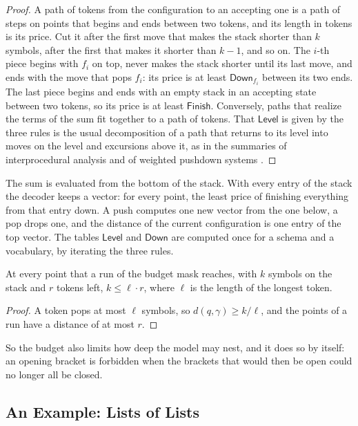 \documentclass[acmsmall,nonacm,screen]{acmart}
\newcommand{\kw}[1]{\mathsf{#1}}
\newcommand{\far}{d}
\newcommand{\Down}{\kw{Down}}
\newcommand{\Level}{\kw{Level}}
\newcommand{\Finish}{\kw{Finish}}
\begin{document}
\begin{proof}
A path of tokens from the configuration to an accepting one is a path of steps on points
that begins and ends between two tokens, and its length in tokens is its price. Cut it after
the first move that makes the stack shorter than $k$ symbols, after the first that makes it
shorter than $k - 1$, and so on. The $i$-th piece begins with $f_i$ on top, never makes the
stack shorter until its last move, and ends with the move that pops $f_i$: its price is at
least $\Down_{f_i}$ between its two ends. The last piece begins and ends with an empty stack
in an accepting state between two tokens, so its price is at least $\Finish$. Conversely,
paths that realize the terms of the sum fit together to a path of tokens. That $\Level$ is
given by the three rules is the usual decomposition of a path that returns to its level into
moves on the level and excursions above it, as in the summaries of interprocedural analysis
and of weighted pushdown systems \citep{Reps2005}.
\end{proof}

The sum is evaluated from the bottom of the stack. With every entry of the stack the decoder
keeps a vector: for every point, the least price of finishing everything from that entry
down. A push computes one new vector from the one below, a pop drops one, and the distance
of the current configuration is one entry of the top vector. The tables $\Level$ and $\Down$
are computed once for a schema and a vocabulary, by iterating the three rules.

\begin{corollary}[Depth]\label{cor:depth}
At every point that a run of the budget mask reaches, with $k$ symbols on the stack and $r$
tokens left, $k \le \ell \cdot r$, where $\ell$ is the length of the longest token.
\end{corollary}

\begin{proof}
A token pops at most $\ell$ symbols, so $\far(q, \gamma) \ge k / \ell$, and the points of a
run have a distance of at most $r$.
\end{proof}

So the budget also limits how deep the model may nest, and it does so by itself: an opening
bracket is forbidden when the brackets that would then be open could no longer all be
closed.

\subsection{An Example: Lists of Lists}
\end{document}
